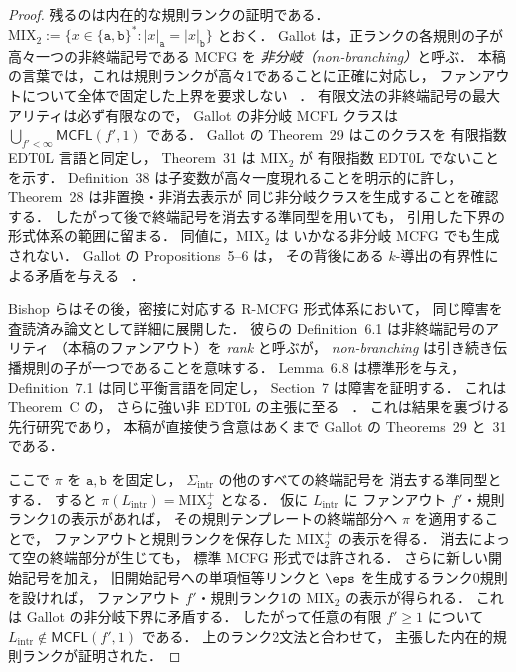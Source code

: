 \begin{proof}
残るのは内在的な規則ランクの証明である．
\(\mathrm{MIX}_2 :=\{x\in\{\mathtt a,\mathtt b\}^*: |x|_{\mathtt a}=|x|_{\mathtt b}\}\)
とおく．
Gallot は，正ランクの各規則の子が
高々一つの非終端記号である MCFG を
\emph{非分岐（non-branching）}と呼ぶ．
本稿の言葉では，これは規則ランクが高々1であることに正確に対応し，
ファンアウトについて全体で固定した上界を要求しない
~\cite[Definition~38]{Gallot2021}．
有限文法の非終端記号の最大アリティは必ず有限なので，
Gallot の非分岐 MCFL クラスは
\(\bigcup_{f'<\infty}\mathsf{MCFL}(f',1)\)
である．
Gallot の Theorem~29 はこのクラスを
有限指数 EDT0L 言語と同定し，
Theorem~31 は $\mathrm{MIX}_2$ が
有限指数 EDT0L でないことを示す．
Definition~38 は子変数が高々一度現れることを明示的に許し，
Theorem~28 は非置換・非消去表示が
同じ非分岐クラスを生成することを確認する．
したがって後で終端記号を消去する準同型を用いても，
引用した下界の形式体系の範囲に留まる．
同値に，$\mathrm{MIX}_2$ は
いかなる非分岐 MCFG でも生成されない．
Gallot の Propositions~5--6 は，
その背後にある $k$-導出の有界性による矛盾を与える
~\cite[Theorem~29, Theorem~31,
Propositions~5--6]{Gallot2021}．

Bishop らはその後，密接に対応する R-MCFG 形式体系において，
同じ障害を査読済み論文として詳細に展開した．
彼らの Definition~6.1 は非終端記号のアリティ
（本稿のファンアウト）を \emph{rank} と呼ぶが，
\emph{non-branching} は引き続き伝播規則の子が一つであることを意味する．
Lemma~6.8 は標準形を与え，
Definition~7.1 は同じ平衡言語を同定し，
Section~7 は障害を証明する．
これは Theorem~C の，
さらに強い非 EDT0L の主張に至る
~\cite[Definition~6.1, Lemma~6.8,
Definition~7.1, Section~7, Theorem~C]{BishopEtAl2026EDT0L}．
これは結果を裏づける先行研究であり，
本稿が直接使う含意はあくまで
Gallot の Theorems~29 と~31 である．

ここで $\pi$ を
$\mathtt a,\mathtt b$ を固定し，
$\Sigma_{\mathrm{intr}}$ の他のすべての終端記号を
消去する準同型とする．
すると
\(\pi(L_{\mathrm{intr}})=\mathrm{MIX}_2^+\)
となる．
仮に $L_{\mathrm{intr}}$ に
ファンアウト $f'$・規則ランク1の表示があれば，
その規則テンプレートの終端部分へ $\pi$ を適用することで，
ファンアウトと規則ランクを保存した
$\mathrm{MIX}_2^+$ の表示を得る．
消去によって空の終端部分が生じても，
標準 MCFG 形式では許される．
さらに新しい開始記号を加え，
旧開始記号への単項恒等リンクと
$\eps$ を生成するランク0規則を設ければ，
ファンアウト $f'$・規則ランク1の
$\mathrm{MIX}_2$ の表示が得られる．
これは Gallot の非分岐下界に矛盾する．
したがって任意の有限 $f'\ge1$ について
\(L_{\mathrm{intr}}\notin\mathsf{MCFL}(f',1)\)
である．
上のランク2文法と合わせて，
主張した内在的規則ランクが証明された．
\end{proof}

